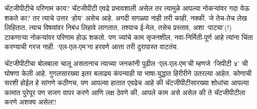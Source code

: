 चॅटजीपीटीचे परिणाम काय?
चॅटजीपीटी एवढे प्रभावशाली असेल तर त्यामुळे आपल्या नोकऱ्यांवर गदा येऊ शकते का? तर त्याचे उत्तर `होय' असेच आहे. अगदी सगळ्या नाही तरी काही, नक्की. जे तेच-तेच लेख लिहितात, त्याच विषयांवर निबंध लिहावे लागतात, तश्याच ई-मेल, तसेच प्रस्ताव, अशा `पाट्या'(!)  टाकणाऱ्या नोकऱ्यांवर परिणाम होऊ शकतो. पण ज्यांचे काम सृजनशील, नवा-निर्मिती-पूर्ण आहे त्यांना चिंता करण्याची गरज नाही. `एल-एल-एम'ना हरवणे आत्ता तरी दुरापास्त वाटतंय.

चॅटजीपीटीचा बोलबाला चालू असतानाच त्याच्या जनकांनी पुढील `एल-एल-एम'ची म्हणजे `जिपीटी ४' ची घोषणा केली आहे. गुगलसारख्या इतर बलाढ्य कंपन्याही या भाषा-युद्धात हिरीरीने उतरल्या आहेत. कोणाची सरशी होईल हे सांगणे कठीणच, पण आपल्या हातात एवढेच आहे की चॅटजीपीटीसारख्या शोधांचा आपल्या कामात पुरेपूर पण सजग वापर करणे आणि लक्ष ठेवणे की, आपले काम असे असेल की ते चॅटजीपीटीला करणे अशक्य असेल!!